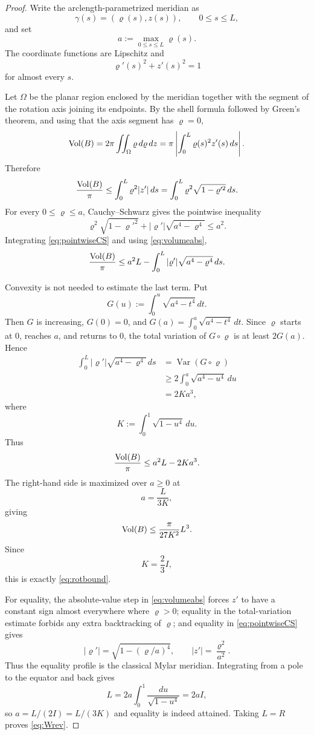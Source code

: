 \begin{proof}
Write the arclength-parametrized meridian as
\[
\gamma(s)=(\varrho(s),z(s)),\qquad 0\le s\le L,
\]
and set
\[
a:=\max_{0\le s\le L}\varrho(s).
\]
The coordinate functions are Lipschitz and
\[
\varrho'(s)^2+z'(s)^2=1
\]
for almost every $s$.

Let $\Omega$ be the planar region enclosed by the meridian together with the segment of the rotation axis joining its endpoints.  By the shell formula followed by Green's theorem, and using that the axis segment has $\varrho=0$,
\[
\operatorname{Vol}(B)
=2\pi\iint_{\Omega}\varrho\,d\varrho\,dz
=\pi\left|\int_0^L\varrho(s)^2z'(s)\,ds\right|.
\]
Therefore
\begin{equation}\label{eq:volumeabs}
\frac{\operatorname{Vol}(B)}{\pi}
\le\int_0^L\varrho^2|z'|\,ds
=\int_0^L\varrho^2\sqrt{1-\varrho'^2}\,ds.
\end{equation}
For every $0\le\varrho\le a$, Cauchy--Schwarz gives the pointwise inequality
\begin{equation}\label{eq:pointwiseCS}
\varrho^2\sqrt{1-\varrho'^2}
+|\varrho'|\sqrt{a^4-\varrho^4}
\le a^2.
\end{equation}
Integrating \eqref{eq:pointwiseCS} and using \eqref{eq:volumeabs},
\begin{equation}\label{eq:beforeTV}
\frac{\operatorname{Vol}(B)}{\pi}
\le a^2L-
\int_0^L|\varrho'|\sqrt{a^4-\varrho^4}\,ds.
\end{equation}

Convexity is not needed to estimate the last term.  Put
\[
G(u):=\int_0^u\sqrt{a^4-t^4}\,dt.
\]
Then $G$ is increasing, $G(0)=0$, and $G(a)=\int_0^a\sqrt{a^4-t^4}\,dt$.  Since $\varrho$ starts at $0$, reaches $a$, and returns to $0$, the total variation of $G\circ\varrho$ is at least $2G(a)$.  Hence
\begin{align*}
\int_0^L|\varrho'|\sqrt{a^4-\varrho^4}\,ds
&=\operatorname{Var}(G\circ\varrho)\\
&\ge2\int_0^a\sqrt{a^4-u^4}\,du\\
&=2Ka^3,
\end{align*}
where
\[
K:=\int_0^1\sqrt{1-u^4}\,du.
\]
Thus
\begin{equation}\label{eq:cubicbound}
\frac{\operatorname{Vol}(B)}{\pi}\le a^2L-2Ka^3.
\end{equation}
The right-hand side is maximized over $a\ge0$ at
\[
a=\frac{L}{3K},
\]
giving
\[
\operatorname{Vol}(B)\le\frac{\pi}{27K^2}L^3.
\]
Since
\[
K=\frac23 I,
\]
this is exactly \eqref{eq:rotbound}.

For equality, the absolute-value step in \eqref{eq:volumeabs} forces $z'$ to have a constant sign almost everywhere where $\varrho>0$; equality in the total-variation estimate forbids any extra backtracking of $\varrho$; and equality in \eqref{eq:pointwiseCS} gives
\[
|\varrho'|=\sqrt{1-(\varrho/a)^4},
\qquad
|z'|=\frac{\varrho^2}{a^2}.
\]
Thus the equality profile is the classical Mylar meridian.  Integrating from a pole to the equator and back gives
\[
L=2a\int_0^1\frac{du}{\sqrt{1-u^4}}=2aI,
\]
so $a=L/(2I)=L/(3K)$ and equality is indeed attained.  Taking $L=R$ proves \eqref{eq:Wrev}.
\end{proof}

